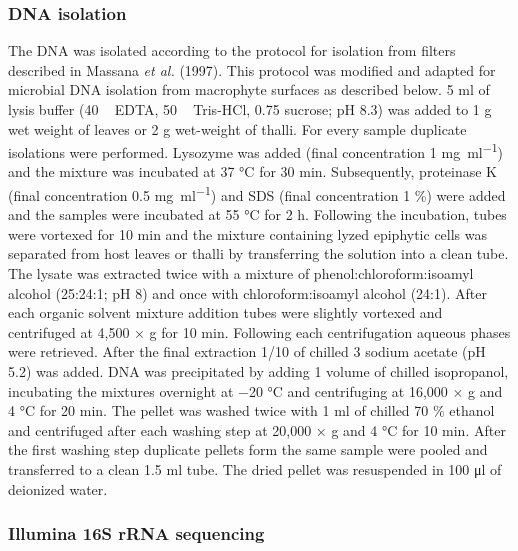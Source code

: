 \documentclass[
  12pt,
]{article}
\begin{document}
\hypertarget{dna-isolation}{%
\subsubsection{DNA isolation}\label{dna-isolation}}

The DNA was isolated according to the protocol for isolation from
filters described in Massana \emph{et al.} (1997). This protocol was
modified and adapted for microbial DNA isolation from macrophyte
surfaces as described below. 5 \si{\ml} of lysis buffer (40
\si{\milli\Molar} EDTA, 50 \si{\milli\Molar} Tris-HCl, 0.75 \si{\Molar}
sucrose; pH 8.3) was added to 1 \si{\g} wet weight of leaves or 2
\si{\g} wet-weight of thalli. For every sample duplicate isolations were
performed. Lysozyme was added (final concentration 1 \si{\mg\per\ml})
and the mixture was incubated at 37 \si{\degreeCelsius} for 30
\si{\minute}. Subsequently, proteinase K (final concentration 0.5
\si{\mg\per\ml}) and SDS (final concentration 1 \si{\percent}) were
added and the samples were incubated at 55 \si{\degreeCelsius} for 2
\si{\hour}. Following the incubation, tubes were vortexed for 10
\si{\minute} and the mixture containing lyzed epiphytic cells was
separated from host leaves or thalli by transferring the solution into a
clean tube. The lysate was extracted twice with a mixture of
phenol:chloroform:isoamyl alcohol (25:24:1; pH 8) and once with
chloroform:isoamyl alcohol (24:1). After each organic solvent mixture
addition tubes were slightly vortexed and centrifuged at 4,500 × g for
10 \si{\minute}. Following each centrifugation aqueous phases were
retrieved. After the final extraction 1/10 of chilled 3 \si{\Molar}
sodium acetate (pH 5.2) was added. DNA was precipitated by adding 1
volume of chilled isopropanol, incubating the mixtures overnight at
\num{-20} °C and centrifuging at 16,000 × g and 4 \si{\degreeCelsius}
for 20 \si{\minute}. The pellet was washed twice with 1 \si{\ml} of
chilled 70 \si{\percent} ethanol and centrifuged after each washing step
at 20,000 × g and 4 \si{\degreeCelsius} for 10 \si{\minute}. After the
first washing step duplicate pellets form the same sample were pooled
and transferred to a clean 1.5 \si{\ml} tube. The dried pellet was
resuspended in 100 \si{\ul} of deionized water.

\hypertarget{illumina-16s-rrna-sequencing}{%
\subsubsection{Illumina 16S rRNA
sequencing}\label{illumina-16s-rrna-sequencing}}
\end{document}
